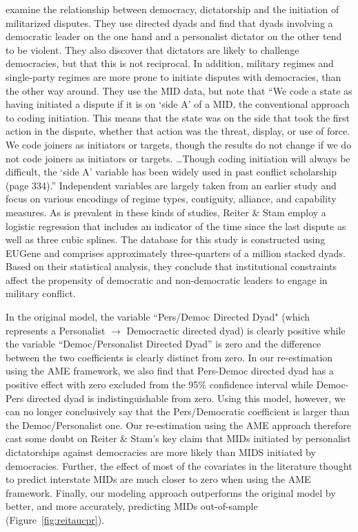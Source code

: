 \citet{reiter:stam:2003} examine the relationship between democracy, dictatorship and the initiation of militarized disputes.  They use directed dyads and find that dyads involving a democratic leader on the one hand and a personalist dictator on the other tend to be violent. They also discover that dictators are likely to challenge democracies, but that this is not reciprocal.  In addition, military regimes and single-party regimes are more prone to initiate disputes with democracies, than the other way around.  They use the MID data, but note that ``We code a state as having initiated a dispute if it is on `side A' of a MID, the conventional approach to coding initiation. This means that the state was on the side that took the first action in the dispute, whether that action was the threat, display, or use of force. We code joiners as initiators or targets, though the results do not change if we do not code joiners as initiators or targets. \ldots Though coding initiation will always be difficult, the `side A' variable has been widely used in past conflict scholarship (page 334).'' Independent variables are largely taken from an earlier study and focus on various encodings of regime types, contiguity, alliance, and capability measures. As is prevalent in these kinds of studies, Reiter \& Stam employ a logistic regression that includes an indicator of the time since the last dispute as well as three cubic splines. The database for this study is constructed using EUGene \citep{bennett:stam:2000} and comprises approximately three-quarters of a million stacked dyads. Based on their statistical analysis, they conclude that institutional constraints affect the propensity of democratic and non-democratic leaders to engage in military conflict. 

In the original model, the variable ``Pers/Democ Directed Dyad" (which represents a Personalist $\rightarrow$ Democractic directed dyad) is clearly positive while the variable ``Democ/Personalist Directed Dyad'' is zero and the difference between the two coefficients is clearly distinct from zero. In our re-estimation using the AME framework, we also find that Pers-Democ directed dyad has a positive effect with zero excluded from the 95\% confidence interval while Democ-Pers directed dyad is indistinguishable from zero. Using this model, however, we can no longer conclusively say that the Pers/Democratic coefficient is larger than the Democ/Personalist one.
Our re-estimation using the AME approach therefore cast some doubt on Reiter \& Stam's key claim that MIDs initiated by personalist dictatorships against democracies are more likely than MIDS initiated by democracies. Further, the effect of most of the covariates in the literature thought to predict interstate MIDs are much closer to zero when using the AME framework. Finally, our modeling approach outperforms the original model by better, and more accurately, predicting MIDs out-of-sample (Figure~\ref{fig:reitaucpr}).  

